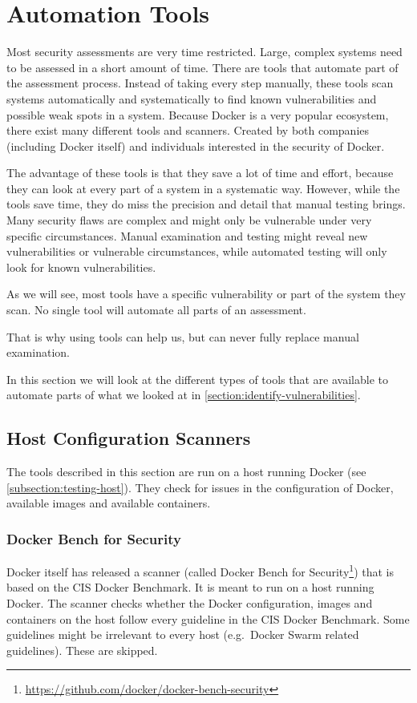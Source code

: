 \section{Automation Tools}\label{section:tools}
Most security assessments are very time restricted. Large, complex systems need to be assessed in a short amount of time. There are tools that automate part of the assessment process. Instead of taking every step manually, these tools scan systems automatically and systematically to find known vulnerabilities and possible weak spots in a system. Because Docker is a very popular ecosystem, there exist many different tools and scanners. Created by both companies (including Docker itself) and individuals interested in the security of Docker.

\medskip

The advantage of these tools is that they save a lot of time and effort, because they can look at every part of a system in a systematic way. However, while the tools save time, they do miss the precision and detail that manual testing brings. Many security flaws are complex and might only be vulnerable under very specific circumstances. Manual examination and testing might reveal new vulnerabilities or vulnerable circumstances, while automated testing will only look for known vulnerabilities.

As we will see, most tools have a specific vulnerability or part of the system they scan. No single tool will automate all parts of an assessment.

That is why using tools can help us, but can never fully replace manual examination.

\medskip
In this section we will look at the different types of tools that are available to automate parts of what we looked at in \autoref{section:identify-vulnerabilities}.

\subsection{Host Configuration Scanners}
The tools described in this section are run on a host running Docker (see \autoref{subsection:testing-host}). They check for issues in the configuration of Docker, available images and available containers.

\subsubsection{Docker Bench for Security}\label{tools:bench}
Docker itself has released a scanner (called Docker Bench for Security\footnote{\url{https://github.com/docker/docker-bench-security}}) that is based on the CIS Docker Benchmark. It is meant to run on a host running Docker. The scanner checks whether the Docker configuration, images and containers on the host follow every guideline in the CIS Docker Benchmark. Some guidelines might be irrelevant to every host (e.g.\ Docker Swarm related guidelines). These are skipped.

